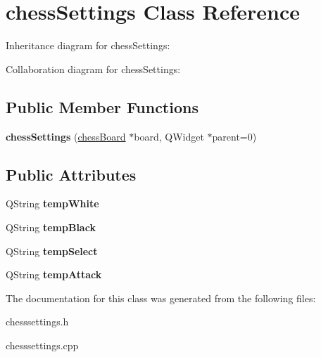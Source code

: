 \hypertarget{classchessSettings}{}\section{chess\+Settings Class Reference}
\label{classchessSettings}


Inheritance diagram for chess\+Settings\+:


Collaboration diagram for chess\+Settings\+:
\subsection*{Public Member Functions}
\begin{DoxyCompactItemize}
\item 
\mbox{\label{classchessSettings_a9b9804678d875a994ec7948c2eff9154}} 
{\bfseries chess\+Settings} (\hyperlink{classchessBoard}{chess\+Board} $\ast$board, Q\+Widget $\ast$parent=0)
\end{DoxyCompactItemize}
\subsection*{Public Attributes}
\begin{DoxyCompactItemize}
\item 
\mbox{\label{classchessSettings_a8175026258f6aff812f8c57ad076c00b}} 
Q\+String {\bfseries temp\+White}
\item 
\mbox{\label{classchessSettings_a3ac3ceb3f0488724d5483c1dfadf358a}} 
Q\+String {\bfseries temp\+Black}
\item 
\mbox{\label{classchessSettings_a1ca15b3fd765819f7227332999a79244}} 
Q\+String {\bfseries temp\+Select}
\item 
\mbox{\label{classchessSettings_a0fac91652a3084376ca48fcd37b1100e}} 
Q\+String {\bfseries temp\+Attack}
\end{DoxyCompactItemize}


The documentation for this class was generated from the following files\+:\begin{DoxyCompactItemize}
\item 
chesssettings.\+h\item 
chesssettings.\+cpp\end{DoxyCompactItemize}
